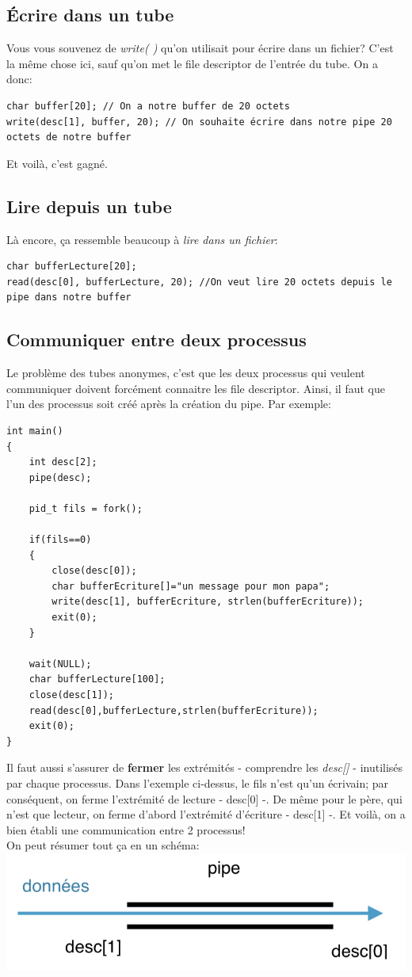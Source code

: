 \documentclass{report}
\begin{document}
\subsection{Écrire dans un tube}
Vous vous souvenez de \emph{write( )} qu'on utilisait pour écrire dans un fichier? C'est la même chose ici, sauf qu'on met le file descriptor de l'entrée du tube. On a donc:
\begin{verbatim}
char buffer[20]; // On a notre buffer de 20 octets
write(desc[1], buffer, 20); // On souhaite écrire dans notre pipe 20 octets de notre buffer
\end{verbatim}
Et voilà, c'est gagné.

\subsection{Lire depuis un tube}
Là encore, ça ressemble beaucoup à \emph{lire dans un fichier}:
\begin{verbatim}
char bufferLecture[20];
read(desc[0], bufferLecture, 20); //On veut lire 20 octets depuis le pipe dans notre buffer
\end{verbatim}

\subsection{Communiquer entre deux processus}
Le problème des tubes anonymes, c'est que les deux processus qui veulent communiquer doivent forcément connaitre les file descriptor. Ainsi, il faut que l'un des processus soit créé après la création du pipe. Par exemple:
\begin{lstlisting}
int main()
{
	int desc[2];
	pipe(desc);
	
	pid_t fils = fork();
	
	if(fils==0)
	{
		close(desc[0]);
		char bufferEcriture[]="un message pour mon papa";
		write(desc[1], bufferEcriture, strlen(bufferEcriture));
		exit(0);
	}
	
	wait(NULL);
	char bufferLecture[100];
	close(desc[1]);
	read(desc[0],bufferLecture,strlen(bufferEcriture));
	exit(0);
}
\end{lstlisting}
Il faut aussi s'assurer de \textbf{fermer} les extrémités - comprendre les \emph{desc[]} - inutilisés par chaque processus. Dans l'exemple ci-dessus, le fils n'est qu'un écrivain; par conséquent, on ferme l'extrémité de lecture - desc[0] -. De même pour le père, qui n'est que lecteur, on ferme d'abord l'extrémité d'écriture - desc[1] -.
Et voilà, on a bien établi une communication entre 2 processus!\\
On peut résumer tout ça en un schéma:\\
\includegraphics{pipe}
\end{document}
